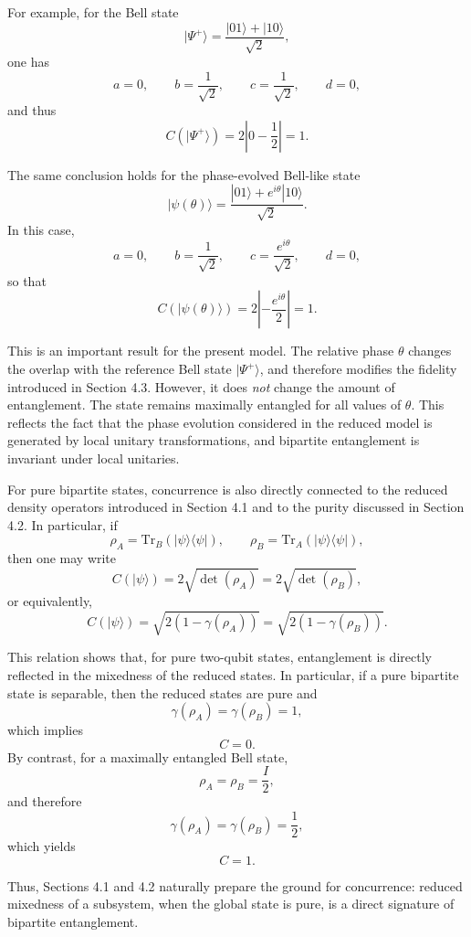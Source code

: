 \documentclass[a4paper]{article}
\begin{document}
\medskip

For example, for the Bell state
\[
|\Psi^+\rangle = \frac{|01\rangle + |10\rangle}{\sqrt{2}},
\]
one has
\[
a=0,\qquad b=\frac{1}{\sqrt{2}},\qquad c=\frac{1}{\sqrt{2}},\qquad d=0,
\]
and thus
\[
C(|\Psi^+\rangle)
=
2\left|0 - \frac{1}{2}\right|
=
1.
\]

The same conclusion holds for the phase-evolved Bell-like state
\[
|\psi(\theta)\rangle
=
\frac{|01\rangle + e^{i\theta}|10\rangle}{\sqrt{2}}.
\]
In this case,
\[
a=0,\qquad b=\frac{1}{\sqrt{2}},\qquad c=\frac{e^{i\theta}}{\sqrt{2}},\qquad d=0,
\]
so that
\[
C(|\psi(\theta)\rangle)
=
2\left|-\frac{e^{i\theta}}{2}\right|
=
1.
\]

This is an important result for the present model. The relative phase \(\theta\) changes the overlap with the reference Bell state \( |\Psi^+\rangle \), and therefore modifies the fidelity introduced in Section 4.3. However, it does \emph{not} change the amount of entanglement. The state remains maximally entangled for all values of \(\theta\). This reflects the fact that the phase evolution considered in the reduced model is generated by local unitary transformations, and bipartite entanglement is invariant under local unitaries.

\medskip

For pure bipartite states, concurrence is also directly connected to the reduced density operators introduced in Section 4.1 and to the purity discussed in Section 4.2. In particular, if
\[
\rho_A = \mathrm{Tr}_B(|\psi\rangle\langle\psi|),
\qquad
\rho_B = \mathrm{Tr}_A(|\psi\rangle\langle\psi|),
\]
then one may write
\[
C(|\psi\rangle)
=
2\sqrt{\det(\rho_A)}
=
2\sqrt{\det(\rho_B)},
\]
or equivalently,
\[
C(|\psi\rangle)
=
\sqrt{2\left(1-\gamma(\rho_A)\right)}
=
\sqrt{2\left(1-\gamma(\rho_B)\right)}.
\]

This relation shows that, for pure two-qubit states, entanglement is directly reflected in the mixedness of the reduced states. In particular, if a pure bipartite state is separable, then the reduced states are pure and
\[
\gamma(\rho_A)=\gamma(\rho_B)=1,
\]
which implies
\[
C=0.
\]
By contrast, for a maximally entangled Bell state,
\[
\rho_A=\rho_B=\frac{I}{2},
\]
and therefore
\[
\gamma(\rho_A)=\gamma(\rho_B)=\frac{1}{2},
\]
which yields
\[
C=1.
\]

Thus, Sections 4.1 and 4.2 naturally prepare the ground for concurrence: reduced mixedness of a subsystem, when the global state is pure, is a direct signature of bipartite entanglement.
\end{document}
